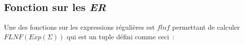 


\subsection{Fonction sur les \textit{ER}}

Une des fonctions sur les expressions régulières est \(flnf\) permettant de
calculer \(FLNF(Exp(\Sigma))\) qui est un tuple défini comme ceci~:

\vphantom{}

